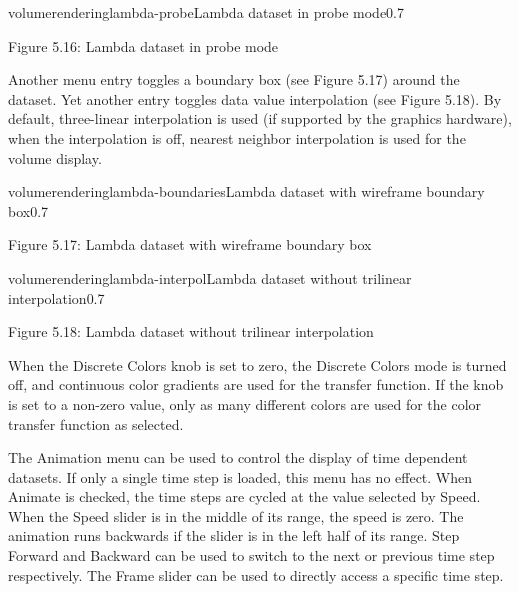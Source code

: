\begin{covimg}{volumerendering}{lambda-probe}{Lambda dataset in probe mode}{0.7}\end{covimg}
\begin{htmlonly}
Figure 5.16: Lambda dataset in probe mode
\vspace{0.5cm}
\end{htmlonly}

\clearpage

Another menu entry toggles a boundary box (see Figure 5.17) around the dataset.
Yet another entry toggles data value interpolation (see Figure 5.18). By default,
three-linear interpolation is used (if supported by the graphics hardware), when the interpolation
is off, nearest neighbor interpolation is used for the volume display.

\begin{covimg}{volumerendering}{lambda-boundaries}{Lambda dataset with wireframe boundary box}{0.7}\end{covimg}
\begin{htmlonly}
Figure 5.17: Lambda dataset with wireframe boundary box
\vspace{0.5cm}
\end{htmlonly}

\begin{covimg}{volumerendering}{lambda-interpol}{Lambda dataset without trilinear interpolation}{0.7}\end{covimg}
\begin{htmlonly}
Figure 5.18: Lambda dataset without trilinear interpolation
\vspace{0.5cm}
\end{htmlonly}

When the Discrete Colors knob is set to zero, the Discrete Colors mode is turned off, and continuous
color gradients are used for the transfer function. If the knob is set to a non-zero value, only as many different 
colors are used for the color transfer function as selected.

The Animation menu can be used to control the display of time dependent datasets. If only a single time step
is loaded, this menu has no effect. When Animate is checked, the time steps are cycled at the value
selected by Speed. When the Speed slider is in the middle of its range, the speed is zero. The animation runs backwards
if the slider is in the left half of its range. Step Forward and Backward can be used to switch to the next or 
previous time step respectively. The Frame slider can be used to directly access a specific time step.


